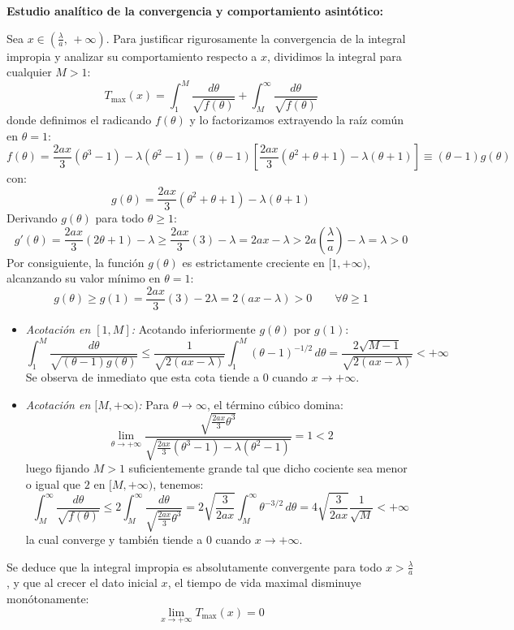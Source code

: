 {\begin{itemize}
        \medskip

        \textbf{Estudio analítico de la convergencia y comportamiento asintótico:}

        Sea $x \in \left( \frac{\lambda}{a}, \, +\infty \right)$. Para justificar rigurosamente la convergencia de la integral impropia y analizar su comportamiento respecto a $x$, dividimos la integral para cualquier $M > 1$:
        \[
            T_{\max}(x) = \int_1^M \frac{d\theta}{\sqrt{f(\theta)}} + \int_M^\infty \frac{d\theta}{\sqrt{f(\theta)}}
        \]
        donde definimos el radicando $f(\theta)$ y lo factorizamos extrayendo la raíz común en $\theta = 1$:
        \[
            f(\theta) = \frac{2ax}{3}(\theta^3 - 1) - \lambda(\theta^2 - 1) = (\theta - 1)\left[ \frac{2ax}{3}(\theta^2 + \theta + 1) - \lambda(\theta + 1) \right] \equiv (\theta - 1) g(\theta)
        \]
        con:
        \[
            g(\theta) = \frac{2ax}{3}(\theta^2 + \theta + 1) - \lambda(\theta + 1)
        \]
        Derivando $g(\theta)$ para todo $\theta \geq 1$:
        \[
            g'(\theta) = \frac{2ax}{3}(2\theta + 1) - \lambda \geq \frac{2ax}{3}(3) - \lambda = 2ax - \lambda > 2a\left(\frac{\lambda}{a}\right) - \lambda = \lambda > 0
        \]
        Por consiguiente, la función $g(\theta)$ es estrictamente creciente en $[1, +\infty)$, alcanzando su valor mínimo en $\theta = 1$:
        \[
            g(\theta) \geq g(1) = \frac{2ax}{3}(3) - 2\lambda = 2(ax - \lambda) > 0 \qquad \forall \theta \geq 1
        \]
        \begin{itemize}
            \item \textit{Acotación en $[1, M]$:} Acotando inferiormente $g(\theta)$ por $g(1)$:
            \[
                \int_1^M \frac{d\theta}{\sqrt{(\theta - 1) g(\theta)}} \leq \frac{1}{\sqrt{2(ax - \lambda)}} \int_1^M (\theta - 1)^{-1/2}\, d\theta = \frac{2\sqrt{M - 1}}{\sqrt{2(ax - \lambda)}} < +\infty
            \]
            Se observa de inmediato que esta cota tiende a $0$ cuando $x \to +\infty$.
            \item \textit{Acotación en $[M, +\infty)$:} Para $\theta \to \infty$, el término cúbico domina:
            \[
                \lim_{\theta \to +\infty} \frac{\sqrt{\frac{2ax}{3}\theta^3}}{\sqrt{\frac{2ax}{3}(\theta^3 - 1) - \lambda(\theta^2 - 1)}} = 1 < 2
            \]
            luego fijando $M > 1$ suficientemente grande tal que dicho cociente sea menor o igual que $2$ en $[M, +\infty)$, tenemos:
            \[
                \int_M^\infty \frac{d\theta}{\sqrt{f(\theta)}} \leq 2 \int_M^\infty \frac{d\theta}{\sqrt{\frac{2ax}{3}\theta^3}} = 2 \sqrt{\frac{3}{2ax}} \int_M^\infty \theta^{-3/2}\, d\theta = 4 \sqrt{\frac{3}{2ax}} \frac{1}{\sqrt{M}} < +\infty
            \]
            la cual converge y también tiende a $0$ cuando $x \to +\infty$.
        \end{itemize}
        Se deduce que la integral impropia es absolutamente convergente para todo $x > \frac{\lambda}{a}$, y que al crecer el dato inicial $x$, el tiempo de vida maximal disminuye monótonamente:
        \[
            \lim_{x \to +\infty} T_{\max}(x) = 0
        \]


\end{itemize}}
